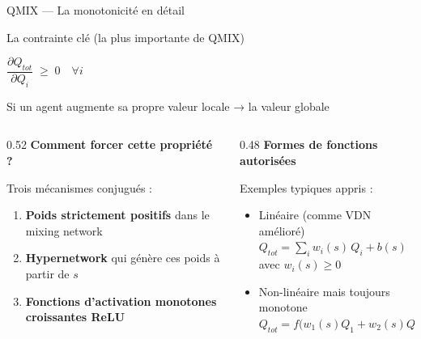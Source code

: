 \documentclass{beamer}
\begin{document}
\begin{frame}{QMIX — La monotonicité en détail}

\begin{block}{La contrainte clé (la plus importante de QMIX)}
\centerline{\Large $\dfrac{\partial Q_{tot}}{\partial Q_i} \;\geq\; 0 \quad \forall i$}
\vspace{0.4em}
Si un agent augmente sa propre valeur locale → la valeur globale 
\end{block}

\bigskip

\begin{columns}[T]

\begin{column}{0.52\textwidth}
\textbf{Comment forcer cette propriété ?}

Trois mécanismes conjugués :

\begin{enumerate}[leftmargin=*,label=\small\arabic*.]
    \item \textbf{Poids strictement positifs} dans le mixing network
    \item \textbf{Hypernetwork} qui génère ces poids à partir de $s$
    \item \textbf{Fonctions d'activation monotones croissantes ReLU} 
\end{enumerate}

\end{column}

\begin{column}{0.48\textwidth}
\textbf{Formes de fonctions autorisées}

Exemples typiques appris :

\begin{itemize}
    \item Linéaire (comme VDN amélioré) \\
    $Q_{tot} = \sum_i w_i(s) \, Q_i + b(s)$
    \quad avec $w_i(s) \geq 0$
    
    \bigskip
    
    \item Non-linéaire mais toujours monotone \\
    $Q_{tot} = f\big( w_1(s)Q_1 + w_2(s)Q_2 + \dots , s \big)$
    
    \bigskip
\end{itemize}
\end{column}

\end{columns}

\end{frame}
\end{document}
